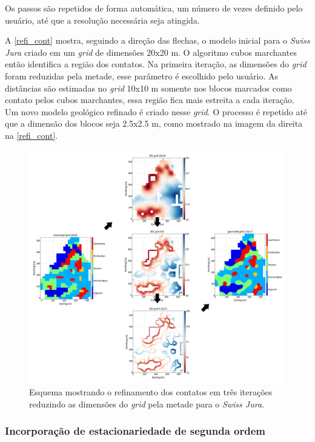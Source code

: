 Os passos são repetidos de forma automática, um número de vezes definido pelo usuário, até que a resolução necessária seja atingida.

A \autoref{refi_cont} mostra, seguindo a direção das flechas, o modelo inicial para o \textit{Swiss Jura} criado em um \textit{grid} de dimensões 20x20 m. O algoritmo cubos marchantes então identifica a região dos contatos. Na primeira iteração, as dimensões do \textit{grid} foram reduzidas pela metade, esse parâmetro é escolhido pelo usuário. As distâncias são estimadas no \textit{grid} 10x10 m somente nos blocos marcados como contato pelos cubos marchantes, essa região fica mais estreita a cada iteração. Um novo modelo geológico refinado é criado nesse \textit{grid}. O processo é repetido até que a dimensão dos blocos seja 2.5x2.5 m, como mostrado na imagem da direita na \autoref{refi_cont}.

\begin{figure}[H]
\caption{\label{refi_cont} Esquema mostrando o refinamento dos contatos em três iterações reduzindo as dimensões do \textit{grid} pela metade para o \textit{Swiss Jura}.}
	\centering
		\includegraphics[width=\textwidth]{capitulo_2/imagens/bound_refinement.png}
\end{figure}

\subsubsection{Incorporação de estacionariedade de segunda ordem}

